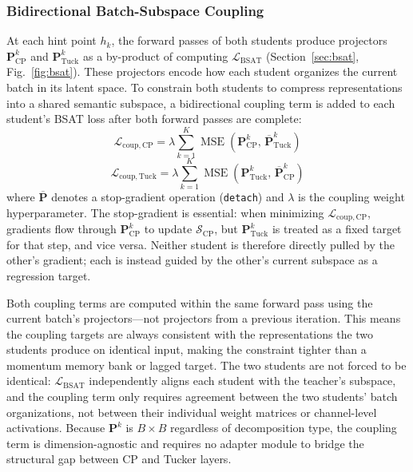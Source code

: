 \documentclass[conference]{IEEEtran}
\begin{document}
\subsubsection{Bidirectional Batch-Subspace Coupling}
\par
At each hint point $h_k$, the forward passes of both students
produce projectors $\mathbf{P}_{\mathrm{CP}}^k$ and
$\mathbf{P}_{\mathrm{Tuck}}^k$ as a by-product of computing
$\mathcal{L}_{\mathrm{BSAT}}$ (Section~\ref{sec:bsat}, Fig.~\ref{fig:bsat}). 
These projectors encode how each student organizes the current batch in
its latent space. To constrain both students to compress
representations into a shared semantic subspace, a bidirectional
coupling term is added to each student's BSAT loss after both
forward passes are complete:
\begin{equation}
    \mathcal{L}_{\mathrm{coup},\mathrm{CP}} =
    \lambda \sum_{k=1}^{K}
    \operatorname{MSE}\!\left(\mathbf{P}_{\mathrm{CP}}^k,\,
    \overline{\mathbf{P}}_{\mathrm{Tuck}}^k\right)
\end{equation}
\begin{equation}
    \mathcal{L}_{\mathrm{coup},\mathrm{Tuck}} =
    \lambda \sum_{k=1}^{K}
    \operatorname{MSE}\!\left(\mathbf{P}_{\mathrm{Tuck}}^k,\,
    \overline{\mathbf{P}}_{\mathrm{CP}}^k\right)
\end{equation}
where $\overline{\mathbf{P}}$ denotes a stop-gradient operation
(\texttt{detach}) and $\lambda$ is the coupling weight
hyperparameter. The stop-gradient is essential: when minimizing
$\mathcal{L}_{\mathrm{coup},\mathrm{CP}}$, gradients flow through
$\mathbf{P}_{\mathrm{CP}}^k$ to update $\mathcal{S}_{\mathrm{CP}}$,
but $\mathbf{P}_{\mathrm{Tuck}}^k$ is treated as a fixed target
for that step, and vice versa. Neither student is therefore
directly pulled by the other's gradient; each is instead guided
by the other's current subspace as a regression target.

\par
Both coupling terms are computed within the same forward pass
using the current batch's projectors—not projectors from a
previous iteration. This means the coupling targets are always
consistent with the representations the two students produce on
identical input, making the constraint tighter than a momentum
memory bank or lagged target. The two students are not forced to
be identical: $\mathcal{L}_{\mathrm{BSAT}}$ independently aligns
each student with the teacher's subspace, and the coupling term
only requires agreement between the two students' batch
organizations, not between their individual weight matrices or
channel-level activations. Because $\mathbf{P}^k$ is $B \times B$
regardless of decomposition type, the coupling term is
dimension-agnostic and requires no adapter module to bridge the
structural gap between CP and Tucker layers.
\end{document}
